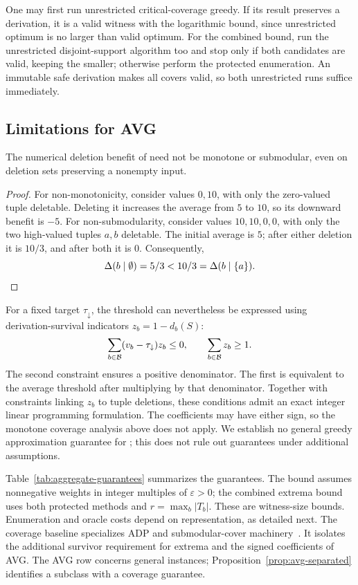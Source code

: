 One may first run unrestricted critical-coverage greedy. If its result
preserves a derivation, it is a valid witness with the logarithmic bound,
since unrestricted optimum is no larger than valid optimum. For the
combined bound, run the unrestricted disjoint-support algorithm too and
stop only if both candidates are valid, keeping the smaller; otherwise
perform the protected enumeration. An immutable safe derivation makes all
covers valid, so both unrestricted runs suffice immediately.

\begin{samepage}
\subsection{Limitations for AVG}
\label{sec:submod-avg}

\begin{proposition}
\label{prop:avg-nonsubmodular}
The numerical deletion benefit of  need not be monotone
or submodular, even on deletion sets preserving a nonempty input.
\end{proposition}
\begin{proof}
For non-monotonicity, consider values $0,10$, with only the zero-valued
tuple deletable. Deleting it increases the average from $5$ to $10$,
so its downward benefit is $-5$. For non-submodularity, consider
values $10,10,0,0$, with only the two high-valued tuples $a,b$
deletable. The initial average is $5$; after either deletion it is
$10/3$, and after both it is $0$. Consequently,
\[
\Delta(b\mid\emptyset)=5/3<10/3=\Delta(b\mid\{a\}).
\]
\end{proof}
\end{samepage}

For a fixed target $\tau_{\downarrow}$, the threshold can nevertheless
be expressed using derivation-survival indicators $z_b=1-d_b(S)$:
\begin{equation}
\label{eq:avg-threshold}
\sum_{b\in\mathcal{B}}(v_b-\tau_{\downarrow})z_b\le0,
\qquad \sum_{b\in\mathcal{B}}z_b\ge1.
\end{equation}
The second constraint ensures a positive denominator. The first is
equivalent to the average threshold after multiplying by that
denominator. Together with constraints linking $z_b$ to tuple
deletions, these conditions admit an exact integer linear programming
formulation. The coefficients may have either sign, so the monotone
coverage analysis above does not apply. We establish no general
greedy approximation guarantee for ; this does not rule
out guarantees under additional assumptions.



Table~\ref{tab:aggregate-guarantees} summarizes the guarantees.
The  bound assumes nonnegative weights in integer multiples
of $\varepsilon>0$; the combined extrema bound uses both protected methods
and $r=\max_b|T_b|$. These are witness-size bounds. Enumeration and oracle
costs depend on representation, as detailed next. The coverage baseline specializes ADP and submodular-cover
machinery~\cite{hu2021adp,wolsey1982greedy}. It isolates the additional
survivor requirement for extrema and the signed coefficients of AVG.
The AVG row concerns general instances; Proposition~\ref{prop:avg-separated}
identifies a subclass with a coverage guarantee.

